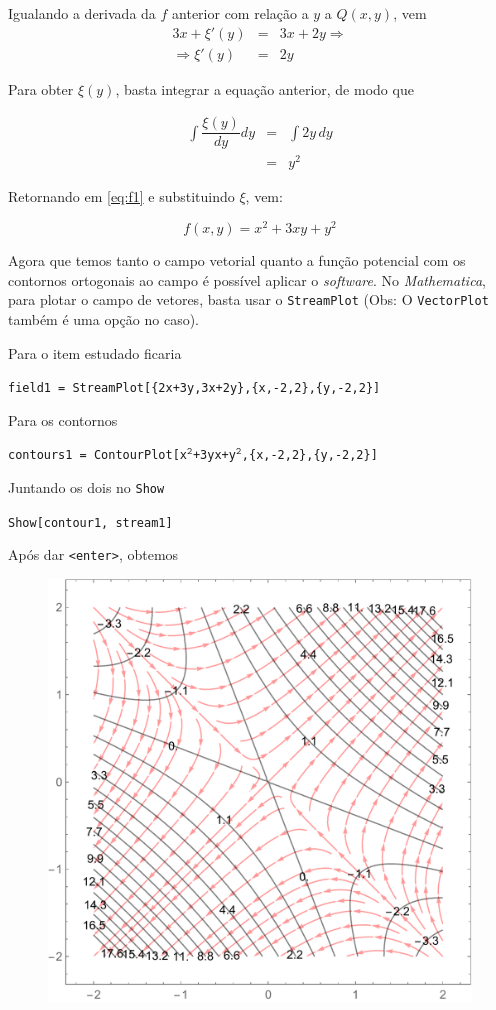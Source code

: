 \documentclass[a4paper, 12pt, brazilian]{article}
\begin{document}
	Igualando a derivada da $f$ anterior com relação a $y$ a $Q(x,y)$, vem
	\begin{eqnarray}
		3x+\xi'(y)&=&3x+2y\Rightarrow\\
		\Rightarrow\xi'(y)&=&2y
	\end{eqnarray}

	Para obter $\xi(y)$, basta integrar a equação anterior, de modo que
	
	\begin{eqnarray}
		\int\dfrac{\xi(y)}{dy}dy&=&\int 2y\,dy\\
		&=&y^{2}
	\end{eqnarray}
	
	Retornando em \eqref{eq:f1} e substituindo $\xi$, vem:
	
	\begin{equation}
		f(x,y)=x^{2}+3xy+y^{2}
	\end{equation}
	
	Agora que temos tanto o campo vetorial quanto a função potencial com os contornos ortogonais ao campo é possível aplicar o \textit{software}. No \textit{Mathematica}, para plotar o campo de vetores, basta usar o \texttt{StreamPlot} (Obs: O \texttt{VectorPlot} também é uma opção no caso).
	
	Para o item estudado ficaria
	
	\begin{center} 			 \texttt{field1 = StreamPlot[\{2x+3y,3x+2y\},\{x,-2,2\},\{y,-2,2\}]}
	\end{center}

	Para os contornos
	
	\begin{center}
		\texttt{contours1 = ContourPlot[x$^{\texttt{2}}$+3yx+y$^{\texttt{2}}$,\{x,-2,2\},\{y,-2,2\}]}
	\end{center}

	Juntando os dois no \texttt{Show}
	
	\begin{center}
		\texttt{Show[contour1, stream1]}
	\end{center}
	Após dar \texttt{<enter>}, obtemos
	
	\begin{figure}[H]
		\centering
		\includegraphics[width=0.7\linewidth]{images/g1}
		\label{fig:g1}
	\end{figure}
\end{document}
